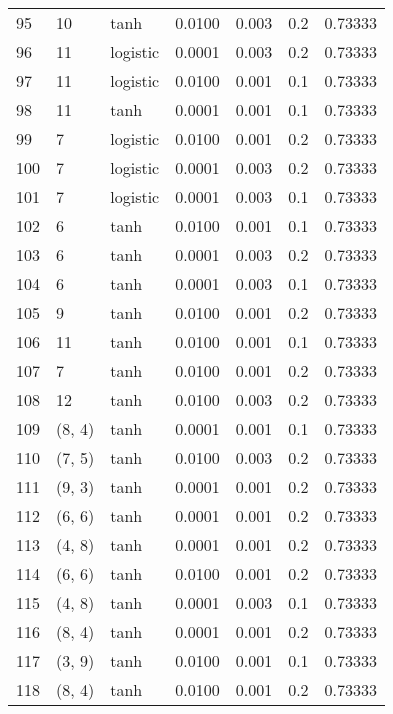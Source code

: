 \begin{tabular}{lllrrrr}
95  &          10 &      tanh &  0.0100 &  0.003 &  0.2 &   0.73333 \\
96  &          11 &  logistic &  0.0001 &  0.003 &  0.2 &   0.73333 \\
97  &          11 &  logistic &  0.0100 &  0.001 &  0.1 &   0.73333 \\
98  &          11 &      tanh &  0.0001 &  0.001 &  0.1 &   0.73333 \\
99  &           7 &  logistic &  0.0100 &  0.001 &  0.2 &   0.73333 \\
100 &           7 &  logistic &  0.0001 &  0.003 &  0.2 &   0.73333 \\
101 &           7 &  logistic &  0.0001 &  0.003 &  0.1 &   0.73333 \\
102 &           6 &      tanh &  0.0100 &  0.001 &  0.1 &   0.73333 \\
103 &           6 &      tanh &  0.0001 &  0.003 &  0.2 &   0.73333 \\
104 &           6 &      tanh &  0.0001 &  0.003 &  0.1 &   0.73333 \\
105 &           9 &      tanh &  0.0100 &  0.001 &  0.2 &   0.73333 \\
106 &          11 &      tanh &  0.0100 &  0.001 &  0.1 &   0.73333 \\
107 &           7 &      tanh &  0.0100 &  0.001 &  0.2 &   0.73333 \\
108 &          12 &      tanh &  0.0100 &  0.003 &  0.2 &   0.73333 \\
109 &      (8, 4) &      tanh &  0.0001 &  0.001 &  0.1 &   0.73333 \\
110 &      (7, 5) &      tanh &  0.0100 &  0.003 &  0.2 &   0.73333 \\
111 &      (9, 3) &      tanh &  0.0001 &  0.001 &  0.2 &   0.73333 \\
112 &      (6, 6) &      tanh &  0.0001 &  0.001 &  0.2 &   0.73333 \\
113 &      (4, 8) &      tanh &  0.0001 &  0.001 &  0.2 &   0.73333 \\
114 &      (6, 6) &      tanh &  0.0100 &  0.001 &  0.2 &   0.73333 \\
115 &      (4, 8) &      tanh &  0.0001 &  0.003 &  0.1 &   0.73333 \\
116 &      (8, 4) &      tanh &  0.0001 &  0.001 &  0.2 &   0.73333 \\
117 &      (3, 9) &      tanh &  0.0100 &  0.001 &  0.1 &   0.73333 \\
118 &      (8, 4) &      tanh &  0.0100 &  0.001 &  0.2 &   0.73333 \\

\end{tabular}
